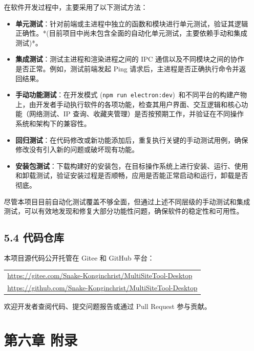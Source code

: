 \documentclass{article}
\begin{document}
在软件开发过程中，主要采用了以下测试方法：

\begin{itemize}
    \item \textbf{单元测试}：针对前端或主进程中独立的函数和模块进行单元测试，验证其逻辑正确性。*(目前项目中尚未包含全面的自动化单元测试，主要依赖手动和集成测试)*。
    \item \textbf{集成测试}：测试主进程和渲染进程之间的 IPC 通信以及不同模块之间的协作是否正常。例如，测试前端发起 Ping 请求后，主进程是否正确执行命令并返回结果。
    \item \textbf{手动功能测试}：在开发模式 (\texttt{npm run electron:dev})\ 和不同平台的构建产物上，由开发者手动执行软件的各项功能，检查其用户界面、交互逻辑和核心功能（网络测试、IP 查询、收藏夹管理）是否按预期工作，并验证在不同操作系统和架构下的兼容性。
    \item \textbf{回归测试}：在代码修改或新功能添加后，重复执行关键的手动测试用例，确保修改没有引入新的问题或破坏现有功能。
    \item \textbf{安装包测试}：下载构建好的安装包，在目标操作系统上进行安装、运行、使用和卸载测试，验证安装过程是否顺畅，应用是否能正常启动和运行，卸载是否彻底。
\end{itemize}

尽管本项目目前自动化测试覆盖不够全面，但通过上述不同层级的手动测试和集成测试，可以有效地发现和修复大部分功能性问题，确保软件的稳定性和可用性。

\subsection*{5.4 代码仓库}

本项目源代码公开托管在 Gitee 和 GitHub 平台：

\begin{tabular}{@{}l}
\href{https://gitee.com/Snake-Konginchrist/MultiSiteTool-Desktop}{https://gitee.com/Snake-Konginchrist/MultiSiteTool-Desktop} \\
\href{https://github.com/Snake-Konginchrist/MultiSiteTool-Desktop}{https://github.com/Snake-Konginchrist/MultiSiteTool-Desktop}
\end{tabular}

欢迎开发者查阅代码、提交问题报告或通过 Pull Request 参与贡献。

\hrulefill

\section*{第六章 附录}
\end{document}
